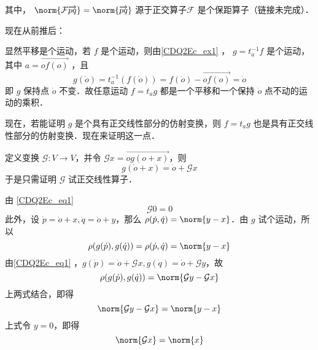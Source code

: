 其中， $\norm{\mathcal F\overrightarrow{pq}}=\norm{\overrightarrow{pq}}$ 源于正交算子$\mathcal F$ 是个保距算子（链接未完成）．

现在从前推后：

显然平移是个运动，若 $f$ 是个运动，则由\autoref{CDQ2Ec_ex1} ， $g=t_a^{-1} f$ 是个运动，其中 $a=\overrightarrow{of(o)}$ ，且
\begin{equation}
g(\dot o)=t_a^{-1}(f(\dot o))=f(\dot o)-\overrightarrow{of(o)}=\dot o
\end{equation}
即 $g$ 保持点 $\dot o$ 不变．故任意运动 $f=t_ag$ 都是一个平移和一个保持 $\dot o$ 点不动的运动的乘积．

现在，若能证明 $g$ 是个具有正交线性部分的仿射变换，则 $f=t_a g$ 也是具有正交线性部分的仿射变换．现在来证明这一点．

定义变换 $\mathcal G:V\rightarrow V$，并令 $\mathcal G x=\overrightarrow{og(o+x)}$，则
\begin{equation}\label{CDQ2Ec_eq1}
g(\dot o+x)=\dot o+\mathcal G x
\end{equation}
于是只需证明 $\mathcal G$ 试正交线性算子．

由 \autoref{CDQ2Ec_eq1} 
\begin{equation}
\mathcal G 0=0
\end{equation}
此外，设 $\dot p=\dot o+x,\dot q=\dot o+y$，那么 $\rho(\dot p,\dot q)=\norm{y-x}$．由 $g$ 试个运动，所以
\begin{equation}
\rho(g(\dot p),g(\dot q))=\rho(\dot p,\dot q)=\norm{y-x}
\end{equation}
由\autoref{CDQ2Ec_eq1} ，$g(\dot p)=\dot o+\mathcal G x, g(\dot q)=\dot o+\mathcal G y$，故
\begin{equation}
\rho(g(\dot p),g(\dot q))=\norm{\mathcal Gy-\mathcal Gx}
\end{equation}
上两式结合，即得
\begin{equation}
\norm{\mathcal Gy-\mathcal Gx}=\norm{y-x}
\end{equation}
上式令 $y=0$，即得
\begin{equation}
\norm{\mathcal G x}=\norm{x}
\end{equation}
